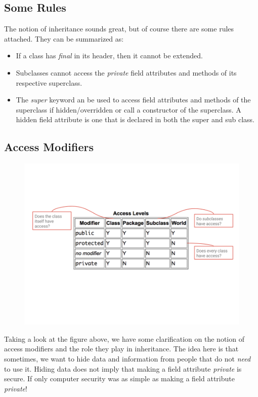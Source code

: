 \documentclass{article}
\begin{document}
\subsection{Some Rules}
The notion of inheritance sounds great, but of course there are some rules attached. They can be summarized as:
    \begin{itemize}
        \item If a class has \textit{final} in its header, then it cannot be extended.
        \item Subclasses cannot access the \textit{private} field attributes and methods of its respective superclass.
        \item The \textit{super} keyword an be used to access field attributes and methods of the superclass if hidden/overridden or call a constructor of the superclass. A hidden field attribute is one that is declared in both the super and sub class.
    \end{itemize}
\newpage
\subsection{Access Modifiers}
\begin{figure}[t]
\includegraphics[scale=0.3]{access}
\centering
\end{figure}
Taking a look at the figure above, we have some clarification on the notion of access modifiers and the role they play in inheritance. The idea here is that sometimes, we want to hide data and information from people that do not \textit{need} to use it. Hiding data does not imply that making a field attribute \textit{private} is secure. If only computer security was as simple as making a field attribute \textit{private}!
\end{document}
